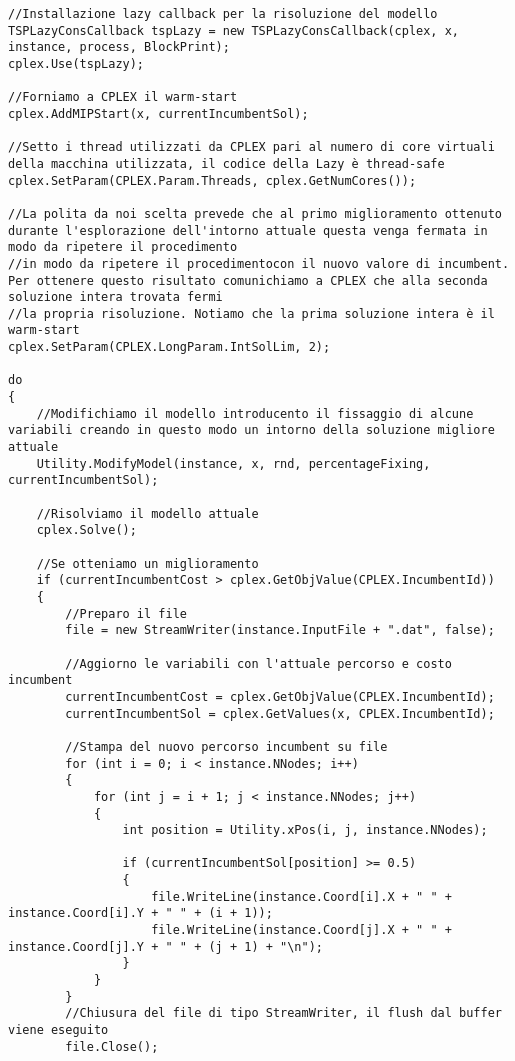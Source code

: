 \documentclass[11pt]{article}
\begin{document}
\begin{lstlisting}
//Installazione lazy callback per la risoluzione del modello
TSPLazyConsCallback tspLazy = new TSPLazyConsCallback(cplex, x, instance, process, BlockPrint);
cplex.Use(tspLazy);

//Forniamo a CPLEX il warm-start
cplex.AddMIPStart(x, currentIncumbentSol);

//Setto i thread utilizzati da CPLEX pari al numero di core virtuali della macchina utilizzata, il codice della Lazy è thread-safe
cplex.SetParam(CPLEX.Param.Threads, cplex.GetNumCores());

//La polita da noi scelta prevede che al primo miglioramento ottenuto durante l'esplorazione dell'intorno attuale questa venga fermata in modo da ripetere il procedimento
//in modo da ripetere il procedimentocon il nuovo valore di incumbent. Per ottenere questo risultato comunichiamo a CPLEX che alla seconda soluzione intera trovata fermi
//la propria risoluzione. Notiamo che la prima soluzione intera è il warm-start
cplex.SetParam(CPLEX.LongParam.IntSolLim, 2);

do
{
    //Modifichiamo il modello introducento il fissaggio di alcune variabili creando in questo modo un intorno della soluzione migliore attuale
    Utility.ModifyModel(instance, x, rnd, percentageFixing, currentIncumbentSol);

    //Risolviamo il modello attuale
    cplex.Solve();

    //Se otteniamo un miglioramento
    if (currentIncumbentCost > cplex.GetObjValue(CPLEX.IncumbentId))
    {
        //Preparo il file
        file = new StreamWriter(instance.InputFile + ".dat", false);

        //Aggiorno le variabili con l'attuale percorso e costo incumbent
        currentIncumbentCost = cplex.GetObjValue(CPLEX.IncumbentId);
        currentIncumbentSol = cplex.GetValues(x, CPLEX.IncumbentId);

        //Stampa del nuovo percorso incumbent su file
        for (int i = 0; i < instance.NNodes; i++)
        {
            for (int j = i + 1; j < instance.NNodes; j++)
            {
                int position = Utility.xPos(i, j, instance.NNodes);

                if (currentIncumbentSol[position] >= 0.5)
                {
                    file.WriteLine(instance.Coord[i].X + " " + instance.Coord[i].Y + " " + (i + 1));
                    file.WriteLine(instance.Coord[j].X + " " + instance.Coord[j].Y + " " + (j + 1) + "\n");
                }
            }
        }
        //Chiusura del file di tipo StreamWriter, il flush dal buffer viene eseguito
        file.Close();


\end{lstlisting}
\end{document}
